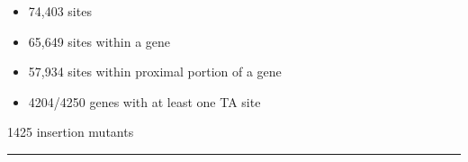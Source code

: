 \documentclass[12pt]{article}
\newcommand{\headsize}{\fontsize{35}{35} \selectfont}
\newcommand{\textsize}{\fontsize{30}{35} \selectfont}
\newcommand{\headcolor}{\color [cmyk]{0.72,0.67,0.33,0}}
\newcommand{\linecolor}{\color [named]{Thistle}}
\begin{document}
\vfill

\hfill
\begin{minipage}[t]{9.5in} \begin{itemize}
\setlength{\rightskip}{0pt plus 1fil} %
\setlength{\itemsep}{15pt}

\item 74,403 sites

\item 65,649 sites within a gene

\item 57,934 sites within proximal portion of a gene

\item 4204/4250 genes with at least one TA site

\end{itemize}
\end{minipage}



\newpage

\headsize \headcolor
\centerline{1425 insertion mutants}
\linecolor \noindent \rule[3mm]{10in}{2mm}

\vspace{5mm}
\normalcolor \textsize 
\end{document}
